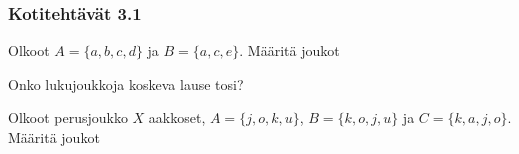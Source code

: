 \subsubsection*{Kotitehtävät  3.1}

\setcounter{tehtava}{0}

\begin{tehtava}
Olkoot $A = \{a, b, c, d\}$ ja $B=\{a, c, e\}$. Määritä joukot
    \begin{alakohdat}
    \end{alakohdat}

    \begin{vastaus}
    
        \begin{alakohdat}
        \end{alakohdat}
    \end{vastaus}
\end{tehtava}

\begin{tehtava}
Onko lukujoukkoja koskeva lause tosi?
    \begin{alakohdat}
        \alakohta{$\zz \subset \nn$}
        \alakohta{$\zz \subset \qq$}
        \alakohta{$\rr \subset \zz$}
        \alakohta{$\qq \subset \nn$}
        \alakohta{$\qq \subset \qq$}             
    \end{alakohdat}

    \begin{vastaus}
    
        \begin{alakohdat}
        \end{alakohdat}
    \end{vastaus}
\end{tehtava}


\begin{tehtava}
Olkoot perusjoukko $X$ aakkoset, $A=\{j, o, k, u\}$, $B=\{k, o, j, u\}$ ja $C=\{k, a, j, o\}$. Määritä joukot
    \begin{alakohdat}
     \end{alakohdat}

    \begin{vastaus}
    
        \begin{alakohdat}
        \alakohta{$\emptyset$}
        \end{alakohdat}
    \end{vastaus}
\end{tehtava}


